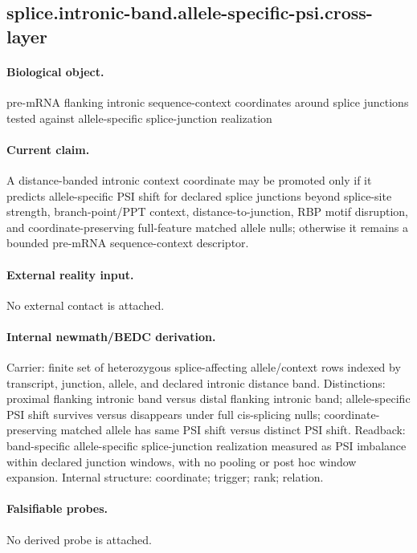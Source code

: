 \subsection{splice.intronic-band.allele-specific-psi.cross-layer}

\paragraph{Biological object.} pre-mRNA flanking intronic sequence-context coordinates around splice junctions tested against allele-specific splice-junction realization

\paragraph{Current claim.} A distance-banded intronic context coordinate may be promoted only if it predicts allele-specific PSI shift for declared splice junctions beyond splice-site strength, branch-point/PPT context, distance-to-junction, RBP motif disruption, and coordinate-preserving full-feature matched allele nulls; otherwise it remains a bounded pre-mRNA sequence-context descriptor.

\paragraph{External reality input.}
No external contact is attached.

\paragraph{Internal newmath/BEDC derivation.} Carrier: finite set of heterozygous splice-affecting allele/context rows indexed by transcript, junction, allele, and declared intronic distance band. Distinctions: proximal flanking intronic band versus distal flanking intronic band; allele-specific PSI shift survives versus disappears under full cis-splicing nulls; coordinate-preserving matched allele has same PSI shift versus distinct PSI shift. Readback: band-specific allele-specific splice-junction realization measured as PSI imbalance within declared junction windows, with no pooling or post hoc window expansion. Internal structure: coordinate; trigger; rank; relation.

\paragraph{Falsifiable probes.}
No derived probe is attached.

